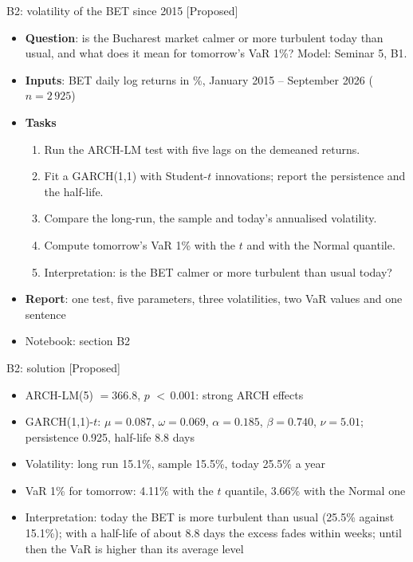 \begin{frame}{B2: volatility of the BET since 2015 [Proposed]}
\itemsize{\footnotesize}
\begin{itemize}
\item \textbf{Question}: is the Bucharest market calmer or more turbulent today than usual, and what does it mean for tomorrow's VaR 1\%? Model: Seminar 5, B1.
\item \textbf{Inputs}: BET daily log returns in \%, January 2015 -- September 2026 ($n = 2\,925$)
\item \textbf{Tasks}
\begin{enumerate}
    \item Run the ARCH-LM test with five lags on the demeaned returns.
    \item Fit a GARCH(1,1) with Student-$t$ innovations; report the persistence and the half-life.
    \item Compare the long-run, the sample and today's annualised volatility.
    \item Compute tomorrow's VaR 1\% with the $t$ and with the Normal quantile.
    \item Interpretation: is the BET calmer or more turbulent than usual today?
\end{enumerate}
\item \textbf{Report}: one test, five parameters, three volatilities, two VaR values and one sentence
\item Notebook: section B2
\end{itemize}
\end{frame}

\ifsolutions
\begin{frame}{B2: solution [Proposed]}
\itemsize{\footnotesize}
\begin{itemize}
    \item ARCH-LM(5) $= 366.8$, $p$ $<$\,0.001: strong ARCH effects
    \item GARCH(1,1)-$t$: $\mu = 0.087$, $\omega = 0.069$, $\alpha = 0.185$, $\beta = 0.740$, $\nu = 5.01$; persistence 0.925, half-life 8.8 days
    \item Volatility: long run 15.1\%, sample 15.5\%, today 25.5\% a year
    \item VaR 1\% for tomorrow: 4.11\% with the $t$ quantile, 3.66\% with the Normal one
    \item Interpretation: today the BET is more turbulent than usual (25.5\% against 15.1\%); with a half-life of about 8.8 days the excess fades within weeks; until then the VaR is higher than its average level
\end{itemize}
\end{frame}
\fi

